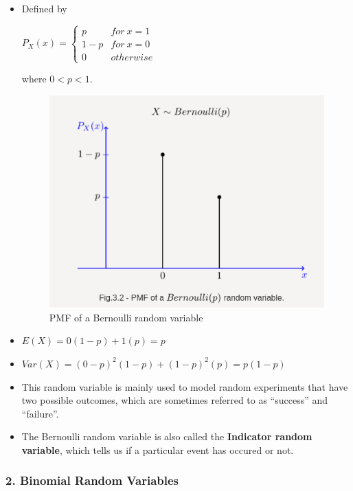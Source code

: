 \begin{itemize}
\item
  Defined by

  \(P_X(x) = \begin{cases}p & for \ x=1\\1-p & for\ x=0\\0 & otherwise\end{cases}\)

  where \(0 < p < 1\).

  \begin{figure}[''h!'']
  \centering
  \includegraphics{Lecture 13 Notes e842fef9a3e0449fa78bac59b75dbc5c/Screenshot_from_2021-08-06_23-12-43.png}
  \caption{PMF of a Bernoulli random variable}
  \end{figure}
\item
  \(E(X) = 0(1-p) + 1(p) = p\)
\item
  \(Var(X) = (0-p)^2(1-p) + (1-p)^2(p) = p(1-p)\)
\item
  This random variable is mainly used to model random experiments that
  have two possible outcomes, which are sometimes referred to as
  ``success'' and ``failure''.
\item
  The Bernoulli random variable is also called the \textbf{Indicator
  random variable}, which tells us if a particular event has occured or
  not.
\end{itemize}

\hypertarget{binomial-random-variables}{%
\subsubsection{2. Binomial Random
Variables}\label{binomial-random-variables}}

